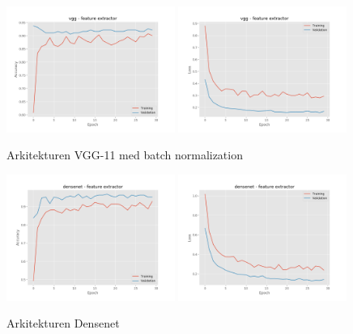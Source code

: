 \documentclass{kththesis}
\begin{document}
    \begin{figure}
      \centering
      \includegraphics[width=0.49\textwidth]{"./room/room-classification - acc - vgg - feature extractor"}
      \includegraphics[width=0.49\textwidth]{"./room/room-classification - loss - vgg - feature extractor"}
      \caption{Arkitekturen VGG-11 med batch normalization}
    \end{figure}
    \begin{figure}
      \centering
      \includegraphics[width=0.49\textwidth]{"./room/room-classification - acc - densenet - feature extractor"}
      \includegraphics[width=0.49\textwidth]{"./room/room-classification - loss - densenet - feature extractor"}
      \caption{Arkitekturen Densenet}
    \end{figure}
\end{document}
